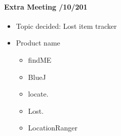 \documentclass[12pt,a4paper]{article}
\begin{document}
\begin{appendices}
      \paragraph{Extra Meeting /10/201}
      \begin{itemize}
      \item Topic decided: Lost item tracker
      \item Product name
        \begin{itemize}
          \item findME
          \item BlueJ
          \item locate.
          \item Lost.
          \item LocationRanger
        \end{itemize}
      \end{itemize}
      

\end{appendices}
\end{document}
